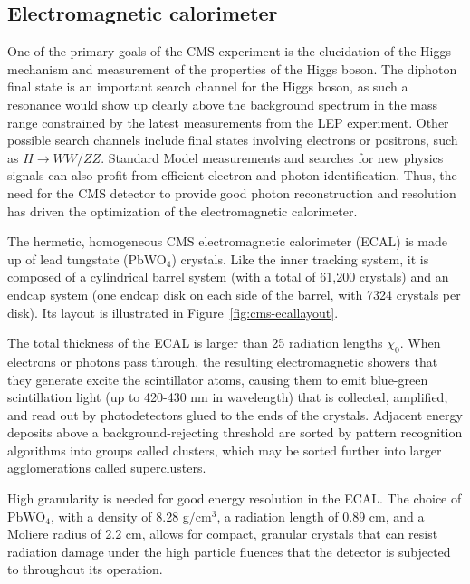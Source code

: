 \subsection{Electromagnetic calorimeter\label{sec:cms-ecal}}

One of the primary goals of the CMS experiment is the elucidation of the Higgs mechanism and measurement of the properties of the Higgs boson. The diphoton final state is an important search channel for the Higgs boson, as such a resonance would show up clearly above the background spectrum in the mass range constrained by the latest measurements from the LEP experiment. Other possible search channels include final states involving electrons or positrons, such as $H\rightarrow$$WW/ZZ$. Standard Model measurements and searches for new physics signals can also profit from efficient electron and photon identification. Thus, the need for the CMS detector to provide good photon reconstruction and resolution has driven the optimization of the electromagnetic calorimeter.

The hermetic, homogeneous CMS electromagnetic calorimeter (ECAL) is made up of lead tungstate (PbWO$_4$) crystals. Like the inner tracking system, it is composed of a cylindrical barrel system (with a total of 61,200 crystals) and an endcap system (one endcap disk on each side of the barrel, with 7324 crystals per disk). Its layout is illustrated in Figure~\ref{fig:cms-ecallayout}.

The total thickness of the ECAL is larger than 25 radiation lengths $\chi_0$. When electrons or photons pass through, the resulting electromagnetic showers that they generate excite the scintillator atoms, causing them to emit blue-green scintillation light (up to 420-430 nm in wavelength) that is collected, amplified, and read out by photodetectors glued to the ends of the crystals. Adjacent energy deposits above a background-rejecting threshold are sorted by pattern recognition algorithms into groups called clusters, which may be sorted further into larger agglomerations called superclusters.

High granularity is needed for good energy resolution in the ECAL. The choice of PbWO$_4$, with a density of 8.28 g/cm$^3$, a radiation length of 0.89 cm, and a Moliere radius of 2.2 cm, allows for compact, granular crystals that can resist radiation damage under the high particle fluences that the detector is subjected to throughout its operation.

